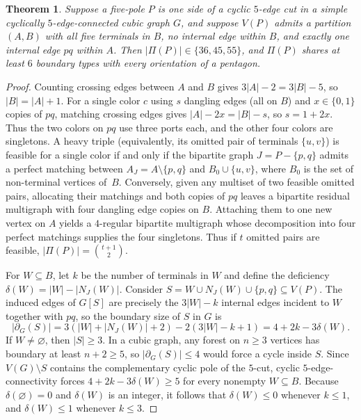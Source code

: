 \documentclass[11pt]{article}
\newtheorem{theorem}{Theorem}
\theoremstyle{remark}
\begin{document}
\begin{theorem}\label{thm:one-defect}
Suppose a five-pole $P$ is one side of a cyclic $5$-edge cut in a simple cyclically
$5$-edge-connected cubic graph $G$, and suppose $V(P)$ admits a partition $(A, B)$ with
all five terminals in $B$, no internal edge within $B$, and exactly one internal edge
$pq$ within $A$. Then $|\Pi(P)| \in \{36, 45, 55\}$, and $\Pi(P)$ shares at least $6$
boundary types with every orientation of a pentagon.
\end{theorem}

\begin{proof}
Counting crossing edges between $A$ and $B$ gives $3|A| - 2 = 3|B| - 5$, so
$|B| = |A| + 1$. For a single color $c$ using $s$ dangling edges (all on $B$) and
$x \in \{0,1\}$ copies of $pq$, matching crossing edges gives $|A| - 2x = |B| - s$, so
$s = 1 + 2x$. Thus the two colors on $pq$ use three ports each, and the other four colors
are singletons. A heavy triple (equivalently, its omitted pair of terminals $\{u, v\}$)
is feasible for a single color if and only if the bipartite graph $J = P - \{p, q\}$
admits a perfect matching between $A_J = A \setminus \{p, q\}$ and
$B_0 \cup \{u, v\}$, where $B_0$ is the set of non-terminal vertices of~$B$. Conversely,
given any multiset of two feasible omitted pairs, allocating their matchings and both
copies of $pq$ leaves a bipartite residual multigraph with four dangling edge copies on
$B$. Attaching them to one new vertex on $A$ yields a $4$-regular bipartite multigraph
whose decomposition into four perfect matchings supplies the four singletons. Thus if
$t$ omitted pairs are feasible, $|\Pi(P)| = \binom{t+1}{2}$.

For $W \subseteq B$, let $k$ be the number of terminals in $W$ and define the deficiency
$\delta(W) = |W| - |N_J(W)|$. Consider $S = W \cup N_J(W) \cup \{p, q\} \subseteq V(P)$.
The induced edges of $G[S]$ are precisely the $3|W| - k$ internal edges incident to $W$
together with $pq$, so the boundary size of $S$ in $G$ is
\[
  |\partial_G(S)| = 3(|W| + |N_J(W)| + 2) - 2(3|W| - k + 1) = 4 + 2k - 3\delta(W).
\]
If $W \neq \varnothing$, then $|S| \ge 3$. In a cubic graph, any forest on $n \ge 3$
vertices has boundary at least $n + 2 \ge 5$, so $|\partial_G(S)| \le 4$ would force a
cycle inside $S$. Since $V(G) \setminus S$ contains the complementary cyclic pole of the
$5$-cut, cyclic $5$-edge-connectivity forces $4 + 2k - 3\delta(W) \ge 5$ for every
nonempty $W \subseteq B$. Because $\delta(\varnothing) = 0$ and $\delta(W)$ is an
integer, it follows that $\delta(W) \le 0$ whenever $k \le 1$, and $\delta(W) \le 1$
whenever $k \le 3$.


\end{proof}
\end{document}
